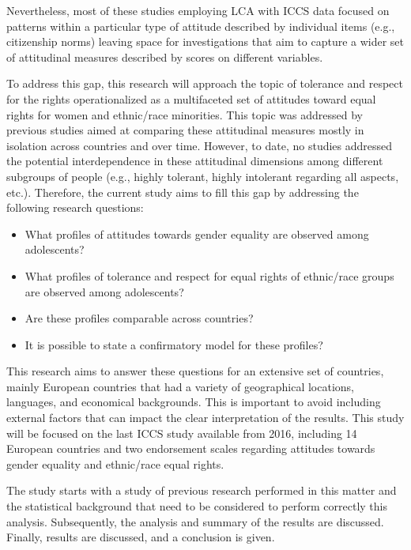 \documentclass[12pt,a4paper,oneside]{reedthesis}
\providecommand{\tightlist}{%
  \setlength{\itemsep}{0pt}\setlength{\parskip}{0pt}}
\begin{document}
Nevertheless, most of these studies employing LCA with ICCS data focused on patterns within a particular type of attitude described by individual items (e.g., citizenship norms) leaving space for investigations that aim to capture a wider set of attitudinal measures described by scores on different variables.

To address this gap, this research will approach the topic of tolerance and respect for the rights operationalized as a multifaceted set of attitudes toward equal rights for women and ethnic/race minorities. This topic was addressed by previous studies aimed at comparing these attitudinal measures mostly in isolation across countries and over time. However, to date, no studies addressed the potential interdependence in these attitudinal dimensions among different subgroups of people (e.g., highly tolerant, highly intolerant regarding all aspects, etc.). Therefore, the current study aims to fill this gap by addressing the following research questions:
\begin{itemize}
\tightlist
\item
  What profiles of attitudes towards gender equality are observed among adolescents?\\
\item
  What profiles of tolerance and respect for equal rights of ethnic/race groups are observed among adolescents?\\
\item
  Are these profiles comparable across countries?\\
\item
  It is possible to state a confirmatory model for these profiles?
\end{itemize}
This research aims to answer these questions for an extensive set of countries, mainly European countries that had a variety of geographical locations, languages, and economical backgrounds. This is important to avoid including external factors that can impact the clear interpretation of the results. This study will be focused on the last ICCS study available from 2016, including 14 European countries and two endorsement scales regarding attitudes towards gender equality and ethnic/race equal rights.

The study starts with a study of previous research performed in this matter and the statistical background that need to be considered to perform correctly this analysis. Subsequently, the analysis and summary of the results are discussed. Finally, results are discussed, and a conclusion is given.
\end{document}
